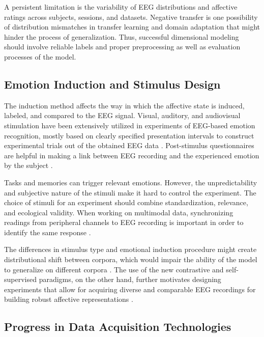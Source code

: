 \documentclass[ASNA,twocolumn]{USG}
\begin{document}
A persistent limitation is the variability of EEG distributions and affective ratings across subjects, sessions, and datasets. Negative transfer is one possibility of distribution mismatches in transfer learning and domain adaptation that might hinder the process of generalization. Thus, successful dimensional modeling should involve reliable labels and proper preprocessing as well as evaluation processes of the model.

\FloatBarrier

\subsection{Emotion Induction and Stimulus Design}

The induction method affects the way in which the affective state is induced, labeled, and compared to the EEG signal. Visual, auditory, and audiovisual stimulation have been extensively utilized in experiments of EEG-based emotion recognition, mostly based on clearly specified presentation intervals to construct experimental trials out of the obtained EEG data \cite{alarcao2017emotions,roy2019deep}. Post-stimulus questionnaires are helpful in making a link between EEG recording and the experienced emotion by the subject \cite{JAFARI2023107450}.

Tasks and memories can trigger relevant emotions. However, the unpredictability and subjective nature of the stimuli make it hard to control the experiment. The choice of stimuli for an experiment should combine standardization, relevance, and ecological validity. When working on multimodal data, synchronizing readings from peripheral channels to EEG recording is important in order to identify the same response \cite{rayatdoost2020expression}.

The differences in stimulus type and emotional induction procedure might create distributional shift between corpora, which would impair the ability of the model to generalize on different corpora \cite{rayatdoost2018cross}. The use of the new contrastive and self-supervised paradigms, on the other hand, further motivates designing experiments that allow for acquiring diverse and comparable EEG recordings for building robust affective representations \cite{shen2022contrastive}.

\subsection{Progress in Data Acquisition Technologies}
\end{document}
